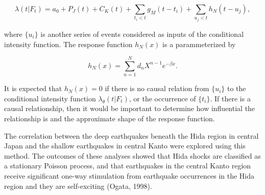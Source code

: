 \documentclass[12pt]{article} %
\theoremstyle{plain}
\begin{document}
	\begin{equation} \label{eq:condquakes_extended}
		\lambda(t | F_t) = a_0+P_J(t)+C_K(t)+\sum_{t_i<t}g_M(t-t_i) + \sum_{u_j<t} h_N (t-u_j),
	\end{equation}
	
	\noindent where $\lbrace u_i \rbrace $ is another series of events considered as inputs of the conditional intensity function. The response function $h_N(x)$ is a parammeterized by 
	
	\begin{equation} \label{eq:parameterized}
		h_N(x)=\sum_{n=1}^{N} d_n X^{n-1} e^{-\beta x}.
	\end{equation}
	
	It is expected that $h_N(x)=0$ if there is no causal relation from $\lbrace u_i \rbrace $ to the conditional intensity function $\lambda_\theta(t|F_t)$, or the occurrence of $\lbrace t_i \rbrace $. If there is a causal relationship, then it would be important to determine how influential the relationship is and the approximate shape of the response function. 
	
	The correlation between the deep earthquakes beneath the Hida region in central Japan and the shallow earthquakes in central Kanto were explored using this method. The outcomes of these analyses showed that Hida shocks are classified as a stationary Poisson process, and that earthquakes in the central Kanto region receive significant one-way stimulation from earthquake occurrences in the Hida region and they are self-exciting (Ogata, 1998).
	
		
	
\end{document}
